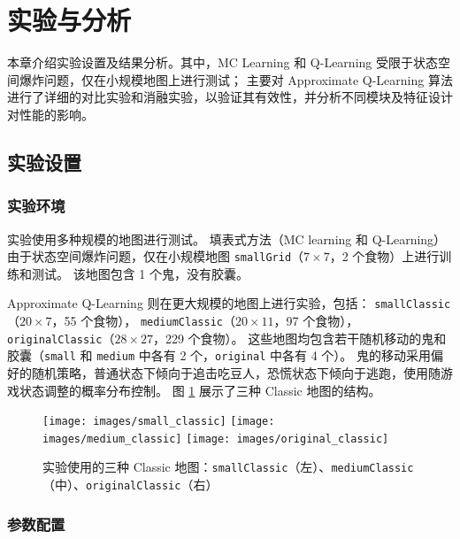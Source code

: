 \section{实验与分析}

本章介绍实验设置及结果分析。其中，MC Learning 和 Q-Learning 受限于状态空间爆炸问题，仅在小规模地图上进行测试；
主要对 Approximate Q-Learning 算法进行了详细的对比实验和消融实验，以验证其有效性，并分析不同模块及特征设计对性能的影响。

\subsection{实验设置}

\subsubsection{实验环境}

实验使用多种规模的地图进行测试。
填表式方法（MC learning 和 Q-Learning）由于状态空间爆炸问题，仅在小规模地图 \texttt{smallGrid}（$7 \times 7$，2 个食物）上进行训练和测试。
该地图包含 1 个鬼，没有胶囊。

Approximate Q-Learning 则在更大规模的地图上进行实验，包括：
\texttt{smallClassic}（$20 \times 7$，55 个食物），
\texttt{mediumClassic}（$20 \times 11$，97 个食物），
\texttt{originalClassic}（$28 \times 27$，229 个食物）。
这些地图均包含若干随机移动的鬼和胶囊（\texttt{small} 和 \texttt{medium} 中各有 2 个，\texttt{original} 中各有 4 个）。
鬼的移动采用偏好的随机策略，普通状态下倾向于追击吃豆人，恐慌状态下倾向于逃跑，使用随游戏状态调整的概率分布控制。
图 \ref{fig:classic_layouts} 展示了三种 Classic 地图的结构。

\begin{figure}[htbp]
    \centering
    \texttt{[image: images/small\_classic]}
    \hfill
    \texttt{[image: images/medium\_classic]}
    \hfill
    \texttt{[image: images/original\_classic]}
    
    \vspace{0.3cm}
    
    \caption{实验使用的三种 Classic 地图：\texttt{smallClassic}（左）、\texttt{mediumClassic}（中）、\texttt{originalClassic}（右）}
    \label{fig:classic_layouts}
\end{figure}

\subsubsection{参数配置}

